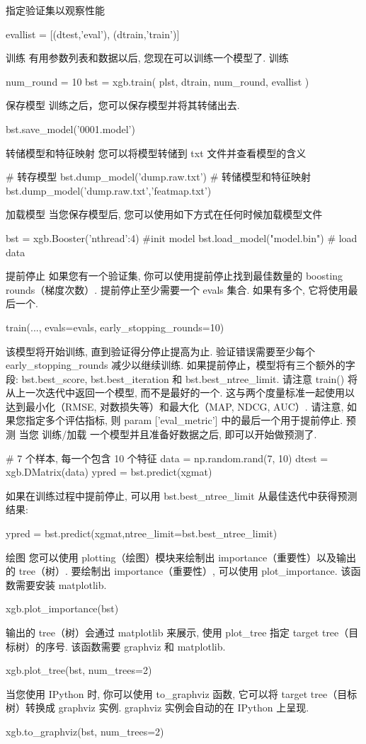 \documentclass{article}
\newenvironment{python}{\VerbatimEnvironment\begin{pythoncode}}{\end{pythoncode}}
\begin{document}
指定验证集以观察性能
\begin{python}
evallist  = [(dtest,'eval'), (dtrain,'train')]
\end{python}
训练
有用参数列表和数据以后, 您现在可以训练一个模型了.
训练
\begin{python}
num_round = 10
bst = xgb.train( plst, dtrain, num_round, evallist )
\end{python}
保存模型 训练之后，您可以保存模型并将其转储出去.
\begin{python}
bst.save_model('0001.model')
\end{python}
转储模型和特征映射 您可以将模型转储到 txt 文件并查看模型的含义
\begin{python}
# 转存模型
bst.dump_model('dump.raw.txt')
# 转储模型和特征映射
bst.dump_model('dump.raw.txt','featmap.txt')
\end{python}
加载模型 当您保存模型后, 您可以使用如下方式在任何时候加载模型文件
\begin{python}
bst = xgb.Booster({'nthread':4}) #init model
bst.load_model("model.bin") # load data
\end{python}
提前停止
如果您有一个验证集, 你可以使用提前停止找到最佳数量的 boosting rounds（梯度次数）. 提前停止至少需要一个 evals 集合. 如果有多个, 它将使用最后一个.
\begin{python}
train(..., evals=evals, early_stopping_rounds=10)
\end{python}
该模型将开始训练, 直到验证得分停止提高为止. 验证错误需要至少每个 early\_stopping\_rounds 减少以继续训练.
如果提前停止，模型将有三个额外的字段: bst.best\_score, bst.best\_iteration 和 bst.best\_ntree\_limit. 请注意 train() 将从上一次迭代中返回一个模型, 而不是最好的一个.
这与两个度量标准一起使用以达到最小化（RMSE, 对数损失等）和最大化（MAP, NDCG, AUC）. 请注意, 如果您指定多个评估指标, 则 param ['eval\_metric'] 中的最后一个用于提前停止.
预测
当您 训练/加载 一个模型并且准备好数据之后, 即可以开始做预测了.
\begin{python}
# 7 个样本, 每一个包含 10 个特征
data = np.random.rand(7, 10)
dtest = xgb.DMatrix(data)
ypred = bst.predict(xgmat)
\end{python}
如果在训练过程中提前停止, 可以用 bst.best\_ntree\_limit 从最佳迭代中获得预测结果:
\begin{python}
ypred = bst.predict(xgmat,ntree_limit=bst.best_ntree_limit)
\end{python}
绘图
您可以使用 plotting（绘图）模块来绘制出 importance（重要性）以及输出的 tree（树）.
要绘制出 importance（重要性）, 可以使用 plot\_importance. 该函数需要安装 matplotlib.
\begin{python}
xgb.plot_importance(bst)
\end{python}
输出的 tree（树）会通过 matplotlib 来展示, 使用 plot\_tree 指定 target tree（目标树）的序号. 该函数需要 graphviz 和 matplotlib.
\begin{python}
xgb.plot_tree(bst, num_trees=2)
\end{python}
当您使用 IPython 时, 你可以使用 to\_graphviz 函数, 它可以将 target tree（目标树）转换成 graphviz 实例. graphviz 实例会自动的在 IPython 上呈现.
\begin{python}
xgb.to_graphviz(bst, num_trees=2)
\end{python}
\end{document}
